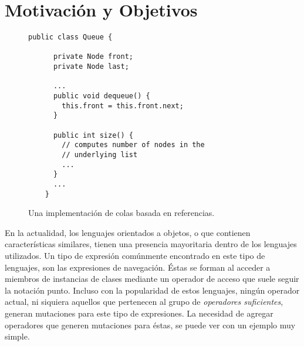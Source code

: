 



\section{Motivaci\'on y Objetivos}
\label{sec:intro.objetivos}

\begin{figure}[t]
	\begin{lstlisting}[frame=tlrb, mathescape=true]
    public class Queue {
	
      private Node front;
      private Node last;
	
      ...
      public void dequeue() {
        this.front = this.front.next;
      }
	
      public int size() {
        // computes number of nodes in the 
        // underlying list
        ...
      }
      ...
    }
	\end{lstlisting}
	\caption{Una implementaci\'on de colas basada en referencias.}
	\label{figures.motivation.queue-class}
\end{figure}

En la actualidad, los lenguajes orientados a objetos, o que contienen caracter\'isticas similares, tienen una presencia mayoritaria dentro de los lenguajes utilizados. Un tipo de expresi\'on com\'unmente encontrado en este tipo de lenguajes, son las expresiones de navegaci\'on. \'Estas se forman al acceder a miembros de instancias de clases mediante un operador de acceso que suele seguir la notaci\'on punto. Incluso con la popularidad de estos lenguajes, ning\'un operador actual, ni siquiera aquellos que pertenecen al grupo de \emph{operadores suficientes}, generan mutaciones para este tipo de expresiones. La necesidad de agregar operadores que generen mutaciones para \'estas, se puede ver con un ejemplo muy simple.

